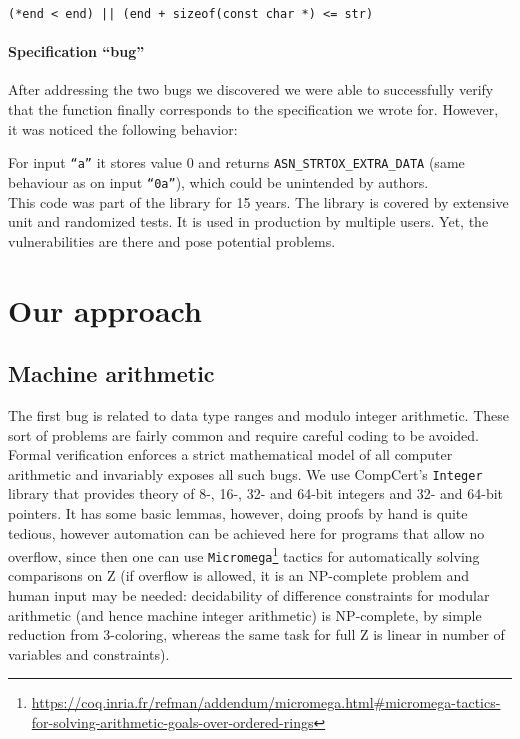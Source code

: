 \documentclass{article}
\begin{document}
{\small
\texttt{(*end < end) || (end + sizeof(const char *) <= str)}}


\paragraph{Specification ``bug''}
After addressing the two bugs we discovered we were able to successfully verify that the function finally corresponds to the specification we wrote for. However, it was noticed the following behavior:

For input \texttt{``a''} it stores value 0 and returns {\color{green}\texttt{ASN\_STRTOX\_EXTRA\_DATA}} (same behaviour as on input \texttt{``0a''}), which could be unintended by authors. \\

This code was part of the library for 15 years. The library is covered by extensive unit and randomized tests. It is used in production by multiple users. Yet, the vulnerabilities are there and pose potential problems.

\section{Our approach}


\subsection{Machine arithmetic}

The first bug is related to data type ranges and modulo integer arithmetic. These sort of problems are fairly common and require careful coding to be avoided. Formal verification enforces a strict mathematical model of all computer arithmetic and invariably exposes all such bugs. We use CompCert's \texttt{Integer} library that provides theory of 8-, 16-, 32- and 64-bit integers and 32- and 64-bit pointers. It has some basic lemmas, however, doing proofs by hand is quite tedious, however automation can be achieved here for programs that allow no overflow, since then one can use \texttt{Micromega}\footnote{\url{https://coq.inria.fr/refman/addendum/micromega.html#micromega-tactics-for-solving-arithmetic-goals-over-ordered-rings}} tactics for automatically solving comparisons on Z (if overflow is allowed, it is an NP-complete problem and human input may be needed: decidability of difference constraints for modular arithmetic (and hence machine integer arithmetic) is NP-complete, by simple reduction from 3-coloring\cite{PointerConstraintsNP}, whereas the same task for full Z is linear in number of variables and constraints).  
\end{document}
